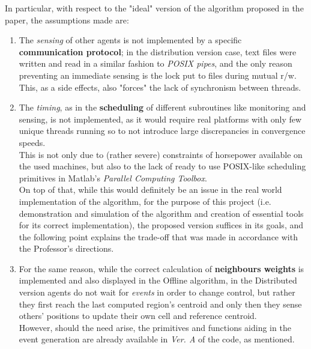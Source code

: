 \documentclass[a4paper,11pt,oneside]{book}
\begin{document}
	In particular, with respect to the "ideal" version of the algorithm proposed in the paper\cite{K1}, the assumptions made are:
	
	\begin{enumerate}
		\item The \textit{sensing} of other agents is not implemented by a specific \textbf{communication protocol}; in the distribution version case, text files were written and read in a similar fashion to \textit{POSIX pipes}, and the only reason preventing an immediate sensing is the lock put to files during mutual r/w.\\This, as a side effects, also "forces" the lack of synchronism between threads.
		
		\item The \textit{timing}, as in the \textbf{scheduling} of different subroutines like monitoring and sensing, is not implemented, as it would require real platforms with only few unique threads running so to not introduce large discrepancies in convergence speeds.\\
		This is not only due to (rather severe) constraints of horsepower available on the used machines, but also to the lack of ready to use POSIX-like scheduling primitives in Matlab's \textit{Parallel Computing Toolbox}.\\
		On top of that, while this would definitely be an issue in the real world implementation of the algorithm, for the purpose of this project (i.e. demonstration and simulation of the algorithm and creation of essential tools for its correct implementation), the proposed version suffices in its goals, and the following point explains the trade-off that was made in accordance with the Professor's directions.
		
		\item For the same reason, while the correct calculation of \textbf{neighbours weights} is implemented and also displayed in the Offline algorithm, in the Distributed version agents do not wait for \textit{events} in order to change control, but rather they first reach the last computed region's centroid and only then they sense others' positions to update their own cell and reference centroid.\\
		However, should the need arise, the primitives and functions aiding in the event generation are already available in \emph{Ver. A} of the code, as mentioned.
		
		
	\end{enumerate}
\end{document}
